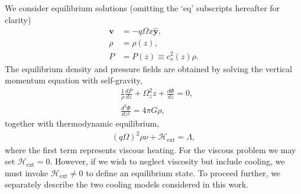 We consider equilibrium solutions (omitting the `eq' subscripts
hereafter for clarity)
\begin{align}
  \bm{v} &= -q\Omega x \hat{\bm{y}}, \\
  \rho   &= \rho(z),\\
  P      &= P(z) \equiv c_s^2(z)\rho.
\end{align} 
The equilibrium density and pressure fields are obtained by solving
the vertical momentum equation with self-gravity,
\begin{align}
  &\frac{1}{\rho}\frac{dP}{dz} +
  \Omega_z^2z + \frac{d\Phi}{dz} = 0, \label{vert_eq1}\\
 &\frac{d^2\Phi}{dz^2} = 4 \pi G \rho,\label{vert_eq2}
\end{align}
together with thermodynamic equilibrium,
\begin{align}\label{thermal_eq}
(q\Omega)^2\rho\nu + \mathcal{H}_\mathrm{ext} = \Lambda,
\end{align}
where the first term represents viscous heating. For the viscous
problem we may set $\mathcal{H}_\mathrm{ext}=0$. However, if we wish
to neglect viscosity but include cooling, we must invoke
$\mathcal{H}_\mathrm{ext}\neq0$ to define an equilibrium state.  
To proceed further, we separately describe the two cooling models
considered in this work. 

